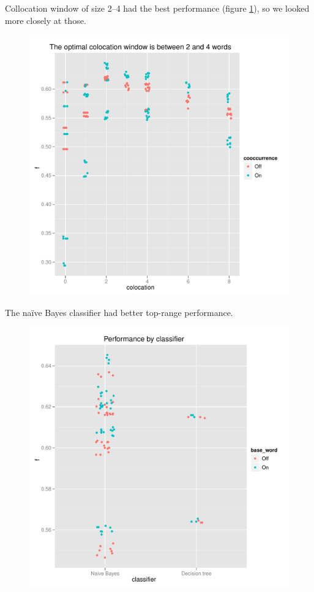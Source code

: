 \documentclass{article}
\newcommand{\naive}{na\"ive}
\begin{document}
Collocation window of size 2--4 had the best performance (figure \ref{fig2}), so we looked more closely at those.

\begin{figure}
\includegraphics[width=\textwidth]{pg_0002}
\caption{\label{fig2}}
\end{figure}

The \naive{} Bayes classifier had better top-range performance.

\begin{figure}
\includegraphics[width=\textwidth]{pg_0003}
\caption{\label{fig3}}
\end{figure}
\end{document}
